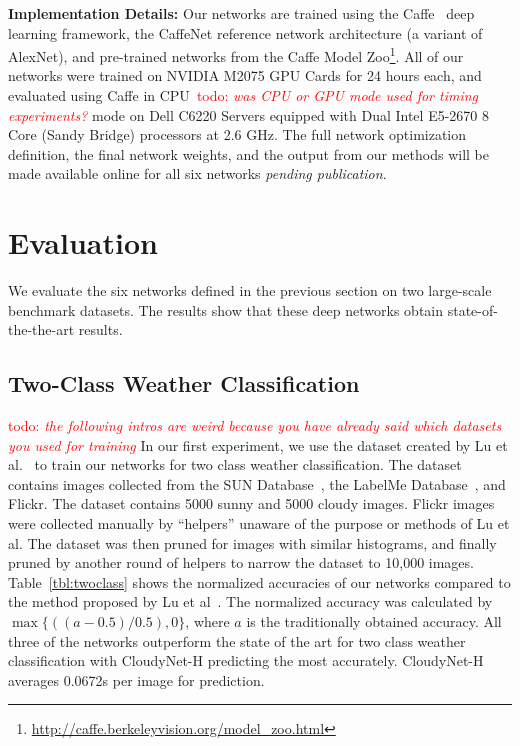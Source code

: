\documentclass[10pt,twocolumn,letterpaper]{article}
\newcommand{\todo}[1]{\textcolor{red}{todo: {\em #1}}}
\newcommand{\tblref}[1]{Table~\ref{tbl:#1}}
\begin{document}
\textbf{Implementation Details:} Our networks are trained using the
Caffe~\cite{caffe14} deep learning framework, the CaffeNet reference network
architecture (a variant of AlexNet), and pre-trained networks
from the Caffe Model
Zoo\footnote{\url{http://caffe.berkeleyvision.org/model_zoo.html}}.
All of our networks were trained on NVIDIA M2075 GPU Cards for 24
hours each, and evaluated using Caffe in CPU~\todo{was CPU or GPU mode used
for timing experiments?} mode on Dell C6220
Servers equipped with Dual Intel E5-2670 8 Core (Sandy Bridge)
processors at 2.6 GHz.  The full network optimization definition, the
final network weights, and the output from our methods will be made
available online for all six networks \emph{pending publication}.

\section{Evaluation}
We evaluate the six networks defined in the previous section on two large-scale
benchmark datasets. The results show that these deep networks obtain
state-of-the-the-art results. 

\subsection{Two-Class Weather Classification}
\todo{the following intros are weird because you have already said which
datasets you used for training}
In our first experiment, we use the dataset created by Lu et
al.~\cite{lutwoclass} to train our networks for two class weather
classification.  The dataset contains images collected from the SUN
Database~\cite{xiaoSUN}, the LabelMe Database~\cite{russell2008labelme}, and
Flickr. The dataset contains 5000 sunny and 5000 cloudy images. Flickr images
were collected manually by ``helpers'' unaware of the purpose or methods of Lu
et al. The dataset was then pruned for images with similar histograms, and
finally pruned by another round of helpers to narrow the dataset to 10,000
images.  \tblref{twoclass} shows the normalized accuracies of our networks
compared to the method proposed by Lu et al~\cite{lutwoclass}.  The normalized
accuracy was calculated by $ \max\{((a - 0.5) / 0.5), 0\} $, where $a$ is the
traditionally obtained accuracy. All three of the networks outperform the state
of the art for two class weather classification with CloudyNet-H predicting the
most accurately.  CloudyNet-H averages 0.0672s per image for prediction. 
\end{document}
